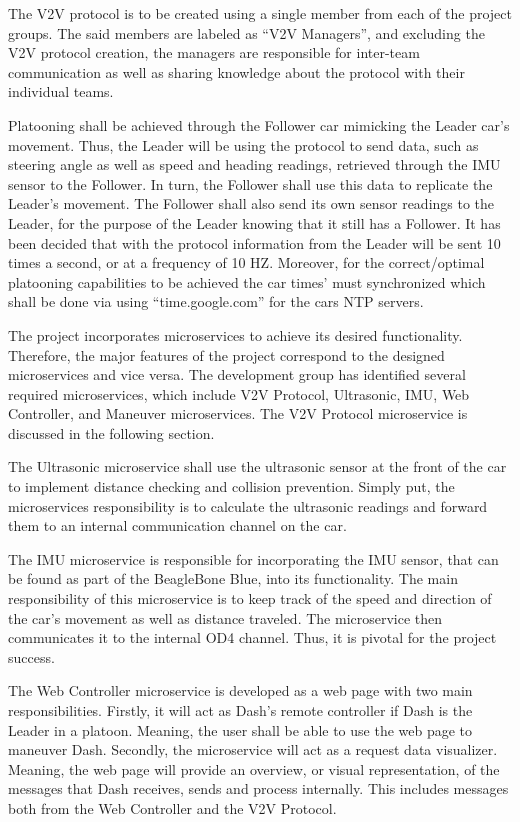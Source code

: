 \documentclass[12pt]{article}
\begin{document}
The V2V protocol is to be created using a single member from each of the project groups. The said members are labeled as “V2V Managers”, and excluding the V2V protocol creation, the managers are responsible for inter-team communication as well as sharing knowledge about the protocol with their individual teams. \par

Platooning shall be achieved through the Follower car mimicking the Leader car’s movement. Thus, the Leader will be using the protocol to send data, such as steering angle as well as speed and heading readings, retrieved through the IMU sensor to the Follower. In turn, the Follower shall use this data to replicate the Leader’s movement. The Follower shall also send its own sensor readings to the Leader, for the purpose of the Leader knowing that it still has a Follower. It has been decided that with the protocol information from the Leader will be sent 10 times a second, or at a frequency of 10 HZ. Moreover, for the correct/optimal platooning capabilities to be achieved the car times’ must synchronized which shall be done via using “time.google.com” for the cars NTP servers.\par
The project incorporates microservices to achieve its desired functionality. Therefore, the major features of the project correspond to the designed microservices and vice versa. The development group has identified several required microservices, which include V2V Protocol, Ultrasonic, IMU, Web Controller, and Maneuver microservices. The V2V Protocol microservice is discussed in the following section. \par

The Ultrasonic microservice shall use the ultrasonic sensor at the front of the car to implement distance checking and collision prevention. Simply put, the microservices responsibility is to calculate the ultrasonic readings and forward them to an internal communication channel on the car. \par

The IMU microservice is responsible for incorporating the IMU sensor, that can be found as part of the BeagleBone Blue, into its functionality. The main responsibility of this microservice is to keep track of the speed and direction of the car’s movement as well as distance traveled. The microservice then communicates it to the internal OD4 channel. Thus, it is pivotal for the project success. \par

The Web Controller microservice is developed as a web page with two main responsibilities. Firstly, it will act as Dash’s remote controller if Dash is the Leader in a platoon. Meaning, the user shall be able to use the web page to maneuver Dash. Secondly, the microservice will act as a request data visualizer. Meaning, the web page will provide an overview, or visual representation, of the messages that Dash receives, sends and process internally. This includes messages both from the Web Controller and the V2V Protocol. \par  
\end{document}
